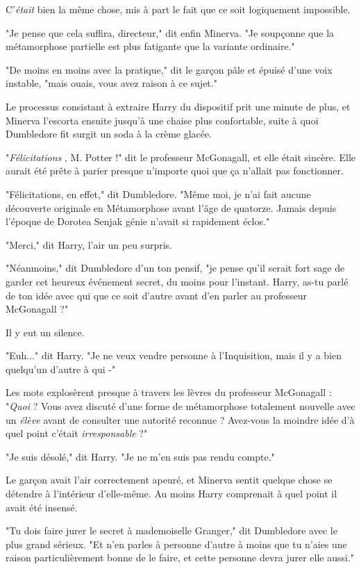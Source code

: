 C'\emph{était}  bien la même chose, mis à part le fait que ce soit logiquement impossible.

"Je pense que cela suffira, directeur," dit enfin Minerva. "Je soupçonne que la métamorphose partielle est plus fatigante que la variante ordinaire."

"De moins en moins avec la pratique," dit le garçon pâle et épuisé d'une voix instable, "mais ouais, vous avez raison à ce sujet."

Le processus consistant à extraire Harry du dispositif prit une minute de plus, et Minerva l'escorta ensuite jusqu'à une chaise plus confortable, suite à quoi Dumbledore fit surgit un soda à la crème glacée.

"\emph{Félicitations} , M. Potter !" dit le professeur McGonagall, et elle était sincère. Elle aurait été prête à parier presque n'importe quoi que ça n'allait pas fonctionner.

"Félicitations, en effet," dit Dumbledore. "Même moi, je n'ai fait aucune découverte originale en Métamorphose avant l'âge de quatorze. Jamais depuis l'époque de Dorotea Senjak génie n'avait si rapidement éclos."

"Merci," dit Harry, l'air un peu surpris.

"Néanmoins," dit Dumbledore d'un ton pensif, "je pense qu'il serait fort sage de garder cet heureux événement secret, du moins pour l'instant. Harry, as-tu parlé de ton idée avec qui que ce soit d'autre avant d'en parler au professeur McGonagall ?"

Il y eut un silence.

"Euh..." dit Harry. "Je ne veux vendre personne à l'Inquisition, mais il y a bien quelqu'un d'autre à qui -"

Les mots explosèrent presque à travers les lèvres du professeur McGonagall : "\emph{Quoi}  ? Vous avez discuté d'une forme de métamorphose totalement nouvelle avec un \emph{élève}  avant de consulter une autorité reconnue ? Avez-vous la moindre idée d'à quel point c'était \emph{irresponsable}  ?"

"Je suis désolé," dit Harry. "Je ne m'en suis pas rendu compte."

Le garçon avait l'air correctement apeuré, et Minerva sentit quelque chose se détendre à l'intérieur d'elle-même. Au moins Harry comprenait à quel point il avait été insensé.

"Tu dois faire jurer le secret à mademoiselle Granger," dit Dumbledore avec le plus grand sérieux. "Et n'en parles à personne d'autre à moins que tu n'aies une raison particulièrement bonne de le faire, et cette personne devra jurer elle aussi."

